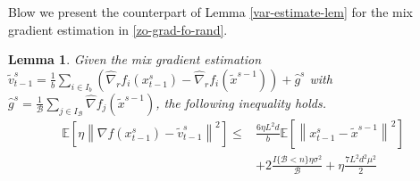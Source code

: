 \documentclass{article}
\newcommand*{\E}{\mathbb{E}}
\newcommand{\norm}[1]{\left\lVert#1\right\rVert}
\newtheorem{lemma}[theorem]{Lemma}
\theoremstyle{definition}
\theoremstyle{remark}
\begin{document}
Blow we present the counterpart of Lemma \eqref{var-estimate-lem} for the mix gradient estimation in \eqref{zo-grad-fo-rand}.
\begin{lemma}\label{RandSGE-var-estimate-lem}
Given the mix gradient estimation $\tilde{v}_{t-1}^s = \frac{1}{b} \sum_{i\in I_b}\left(\hat{\nabla}_r f_{i}(x_{t-1}^s)-\hat{\nabla}_r f_{i}(\tilde{x}^{s-1})\right)+\hat{g}^s$ with $\hat{g}^s = \frac{1}{\mathcal{B}} \sum_{j\in I_{\mathcal{B}}} \hat{\nabla} f_j (\tilde{x}^{s-1})$, the following inequality holds. 
\begin{equation}
\begin{split}
\E\left[\eta\norm{\nabla f(x_{t-1}^s)-{\tilde{v}_{t-1}^s}}^2\right] \leq&  \frac{6\eta L^2 d}{b}\E\left[\norm{x_{t-1}^s-\tilde{x}^{s-1}}^2\right]\\
&+ 2\frac{I\{\mathcal{B} < n\}\eta \sigma ^2}{\mathcal{B}}+\eta \frac{7L^2 d^2 \mu^2}{2}
\end{split}
\end{equation}
\end{lemma}
\end{document}
